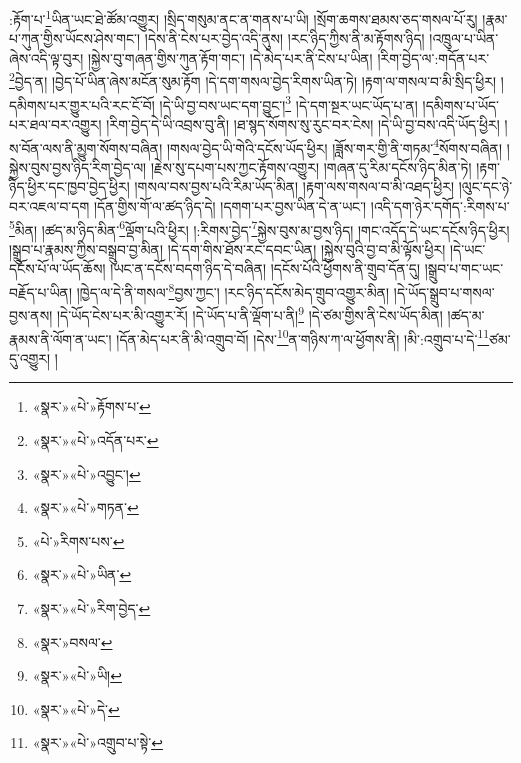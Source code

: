 :རྟོག་པ་\footnote{«སྣར་»«པེ་»རྟོགས་པ་}ཡིན་ཡང་ཐེ་ཚོམ་འགྱུར། །སྲིད་གསུམ་ནང་ན་གནས་པ་ཡི། །སྲོག་ཆགས་ཐམས་ཅད་གསལ་པོ་རུ། །རྣམ་པ་ཀུན་གྱིས་ཡོངས་ཤེས་གང་། །དེས་ནི་ངེས་པར་བྱེད་འདི་ནུས། །རང་ཉིད་ཀྱིས་ནི་མ་རྟོགས་ཉིད། །འཁྲུལ་པ་ཡིན་ཞེས་འདི་ལྟ་བུར། །སྐྱེས་བུ་གཞན་གྱིས་ཀུན་རྟོག་གང་། །དེ་མེད་པར་ནི་ངེས་པ་ཡིན། །རིག་བྱེད་ལ་:གདོན་པར་\footnote{«སྣར་»«པེ་»འདོན་པར་}བྱེད་ན། །བྱེད་པོ་ཡིན་ཞེས་མངོན་སུམ་རྟོག །དེ་དག་གསལ་བྱེད་རིགས་ཡིན་ཏེ། །རྟག་ལ་གསལ་བ་མི་སྲིད་ཕྱིར། །དམིགས་པར་གྱུར་པའི་རང་ངོ་བོ། །དེ་ཡི་བྱ་བས་ཡང་དག་བྱུང་།\footnote{«སྣར་»«པེ་»འབྱུང་།} །དེ་དག་སྔར་ཡང་ཡོད་པ་ན། །དམིགས་པ་ཡོད་པར་ཐལ་བར་འགྱུར། །རིག་བྱེད་དེ་ཡི་འབྲས་བུ་ནི། །ཐ་སྙད་སོགས་སུ་རུང་བར་ངེས། །དེ་ཡི་བྱ་བས་འདི་ཡོད་ཕྱིར། །ས་བོན་ལས་ནི་མྱུག་སོགས་བཞིན། །གསལ་བྱེད་ཡི་གེའི་དངོས་ཡོད་ཕྱིར། །ཟློས་གར་གྱི་ནི་གཏམ་\footnote{«སྣར་»«པེ་»གཏན་}སོགས་བཞིན། །སྐྱེས་བུས་བྱས་ཉིད་རིག་བྱེད་ལ། །རྗེས་སུ་དཔག་པས་ཀྱང་རྟོགས་འགྱུར། །གཞན་དུ་རིམ་དངོས་ཉིད་མིན་ཏེ། །རྟག་ཉིད་ཕྱིར་དང་ཁྱབ་བྱེད་ཕྱིར། །གསལ་བས་བྱས་པའི་རིམ་ཡོད་མིན། །རྟག་ལས་གསལ་བ་མི་འཐད་ཕྱིར། །ལུང་དང་ཉེ་བར་འཇལ་བ་དག །དོན་གྱིས་གོ་ལ་ཚད་ཉིད་དེ། །དགག་པར་བྱས་ཡིན་དེ་ན་ཡང་། །འདི་དག་ཉེར་དགོད་:རིགས་པ་\footnote{«པེ་»རིགས་པས་}མིན། །ཚད་མ་ཉིད་མིན་\footnote{«སྣར་»«པེ་»ཡིན་}ལྡོག་པའི་ཕྱིར། །:རིགས་བྱེད་\footnote{«སྣར་»«པེ་»རིག་བྱེད་}སྐྱེས་བུས་མ་བྱས་ཉིད། །གང་འདོད་དེ་ཡང་དངོས་ཉིད་ཕྱིར། །སྒྲུབ་པ་རྣམས་ཀྱིས་བསྒྲུབ་བྱ་མིན། །དེ་དག་གིས་ཐོས་རང་དབང་ཡིན། །སྐྱེས་བུའི་བྱ་བ་མི་ལྟོས་ཕྱིར། །དེ་ཡང་དངོས་པོ་ལ་ཡོད་ཆོས། །ཡང་ན་དངོས་བདག་ཉིད་དེ་བཞིན། །དངོས་པོའི་ཕྱོགས་ནི་གྲུབ་དོན་དུ། །སྒྲུབ་པ་གང་ཡང་བརྗོད་པ་ཡིན། །ཁྱེད་ལ་དེ་ནི་གསལ་\footnote{«སྣར་»བསལ་}བྱས་ཀྱང་། །རང་ཉིད་དངོས་མེད་གྲུབ་འགྱུར་མིན། །དེ་ཡོད་སྒྲུབ་པ་གསལ་བྱས་ནས། །དེ་ཡོད་ངེས་པར་མི་འགྱུར་རོ། །དེ་ཡོད་པ་ནི་ལྡོག་པ་ནི།\footnote{«སྣར་»«པེ་»ཡི།} །དེ་ཙམ་གྱིས་ནི་ངེས་ཡོད་མིན། །ཚད་མ་རྣམས་ནི་ལོག་ན་ཡང་། །དོན་མེད་པར་ནི་མི་འགྲུབ་བོ། །དེས་\footnote{«སྣར་»«པེ་»དེ་}ན་གཉིས་ཀ་ལ་ཕྱོགས་ནི། །མི་:འགྲུབ་པ་དེ་\footnote{«སྣར་»«པེ་»འགྲུབ་པ་སྟེ་}ཙམ་དུ་འགྱུར། །
